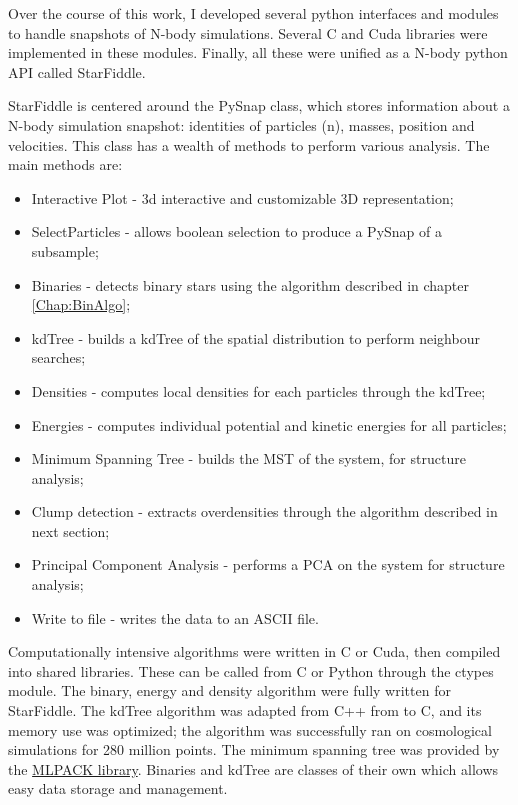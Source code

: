 Over the course of this work, I developed several python interfaces and modules to handle snapshots of N-body simulations. Several C and Cuda libraries were implemented in these modules. Finally, all these were unified as a N-body python API called StarFiddle.

StarFiddle is centered around the PySnap class, which stores information about a N-body simulation snapshot: identities of particles (n), masses, position and velocities. This class has a wealth of methods to perform various analysis. The main methods are:

\begin{itemize}
\item Interactive Plot - 3d interactive and customizable 3D representation;
\item SelectParticles - allows boolean selection to produce a PySnap of a subsample;
\item Binaries - detects binary stars using the algorithm described in chapter \ref{Chap:BinAlgo};
\item kdTree - builds a kdTree of the spatial distribution to perform neighbour searches;
\item Densities - computes local densities for each particles through the kdTree;
\item Energies - computes individual potential and kinetic energies for all particles;
\item Minimum Spanning Tree - builds the MST of the system, for structure analysis;
\item Clump detection - extracts overdensities through the algorithm described in next section;
\item Principal Component Analysis - performs a PCA on the system for structure analysis;
\item Write to file - writes the data to an ASCII file.
\end{itemize}

Computationally intensive algorithms were written in C or Cuda, then compiled into shared libraries. These can be called from C or Python through the ctypes module. The binary, energy and density algorithm were fully written for StarFiddle. The kdTree algorithm was adapted from C++ from \cite{numericalrecipes} to C, and its memory use was optimized; the algorithm was successfully ran on cosmological simulations for 280 million points. The minimum spanning tree was provided by the \href{http://mlpack.org/}{MLPACK library}. Binaries and kdTree are classes of their own which allows easy data storage and management.

